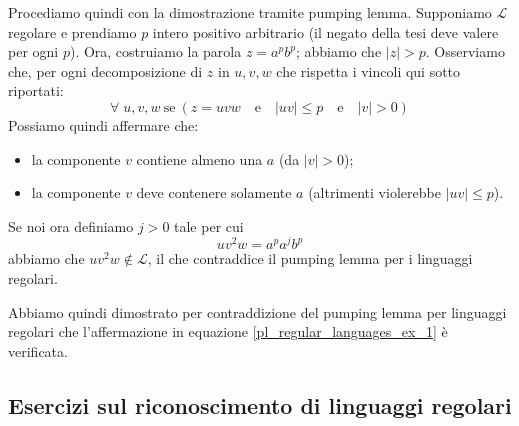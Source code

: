 \documentclass[class=book, crop=false, oneside, 12pt]{standalone}
\begin{document}
Procediamo quindi con la dimostrazione tramite pumping lemma. Supponiamo \(\mathcal{L}\) regolare e prendiamo \(p\) intero positivo arbitrario (il negato della tesi deve valere per ogni \(p\)). Ora, costruiamo la parola \(z=a^p b^p\); abbiamo che \(|z|>p\).
Osserviamo che, per ogni decomposizione di \(z\) in \(u,v,w\) che rispetta i vincoli qui sotto riportati:
\begin{equation*}
    \forall \; u,v,w \ \textrm{se} \ (z = uvw \quad \textrm{e} \quad |uv| \le p \quad \textrm{e} \quad |v| > 0)
\end{equation*}
Possiamo quindi affermare che:
\begin{itemize}
    \item la componente \(v\) contiene almeno una \(a\) (da \(|v| > 0\));
    \item la componente \(v\) deve contenere solamente \(a\) (altrimenti violerebbe \(|uv| \le p\)).
\end{itemize}
Se noi ora definiamo \(j > 0\) tale per cui 
\begin{equation*}
    uv^2w = a^pa^jb^p 
\end{equation*}
abbiamo che \(uv^2w \notin \mathcal{L}\), il che contraddice il pumping lemma per i linguaggi regolari.

Abbiamo quindi dimostrato per contraddizione del pumping lemma per linguaggi regolari che l'affermazione in equazione \ref{pl_regular_languages_ex_1} è verificata.

\subsection{Esercizi sul riconoscimento di linguaggi regolari}
\end{document}
